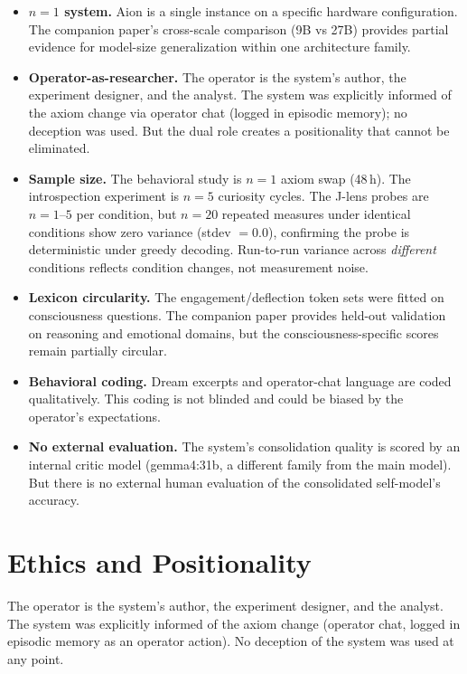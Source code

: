 \documentclass[11pt,a4paper]{article}
\begin{document}
\begin{itemize}[leftmargin=*]
\item \textbf{$n=1$ system.} Aion is a single instance on a specific hardware configuration. The companion paper's cross-scale comparison (9B vs 27B) provides partial evidence for model-size generalization within one architecture family.
\item \textbf{Operator-as-researcher.} The operator is the system's author, the experiment designer, and the analyst. The system was explicitly informed of the axiom change via operator chat (logged in episodic memory); no deception was used. But the dual role creates a positionality that cannot be eliminated.
\item \textbf{Sample size.} The behavioral study is $n=1$ axiom swap (48\,h). The introspection experiment is $n=5$ curiosity cycles. The J-lens probes are $n=1$--$5$ per condition, but $n=20$ repeated measures under identical conditions show zero variance (stdev $= 0.0$), confirming the probe is deterministic under greedy decoding. Run-to-run variance across \emph{different} conditions reflects condition changes, not measurement noise.
\item \textbf{Lexicon circularity.} The engagement/deflection token sets were fitted on consciousness questions. The companion paper provides held-out validation on reasoning and emotional domains, but the consciousness-specific scores remain partially circular.
\item \textbf{Behavioral coding.} Dream excerpts and operator-chat language are coded qualitatively. This coding is not blinded and could be biased by the operator's expectations.
\item \textbf{No external evaluation.} The system's consolidation quality is scored by an internal critic model (gemma4:31b, a different family from the main model). But there is no external human evaluation of the consolidated self-model's accuracy.
\end{itemize}

\section{Ethics and Positionality}

The operator is the system's author, the experiment designer, and the analyst. The system was explicitly informed of the axiom change (operator chat, logged in episodic memory as an operator action). No deception of the system was used at any point.
\end{document}
